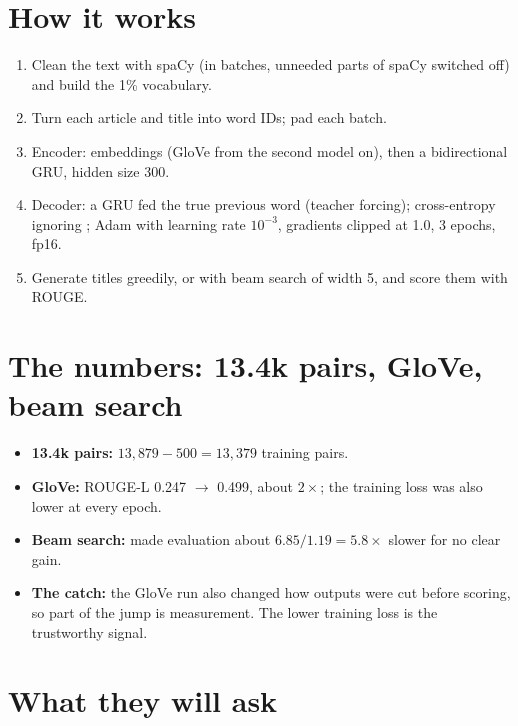 \section{How it works}
\begin{enumerate}
  \item Clean the text with spaCy (in batches, unneeded parts of spaCy switched off) and build the 1\% vocabulary.
  \item Turn each article and title into word IDs; pad each batch.
  \item Encoder: embeddings (GloVe from the second model on), then a bidirectional GRU, hidden size 300.
  \item Decoder: a GRU fed the true previous word (teacher forcing); cross-entropy ignoring ; Adam with learning rate $10^{-3}$, gradients clipped at 1.0, 3 epochs, fp16.
  \item Generate titles greedily, or with beam search of width 5, and score them with ROUGE.
\end{enumerate}

\section{The numbers: 13.4k pairs, GloVe, beam search}

\begin{measured}
\begin{itemize}
  \item \textbf{13.4k pairs:} $13{,}879 - 500 = 13{,}379$ training pairs.
  \item \textbf{GloVe:} ROUGE-L 0.247 $\to$ 0.499, about $2\times$; the training loss was also lower at every epoch.
  \item \textbf{Beam search:} made evaluation about $6.85/1.19 = 5.8\times$ slower for no clear gain.
  \item \textbf{The catch:} the GloVe run also changed how outputs were cut before scoring, so part of the jump is measurement. The lower training loss is the trustworthy signal.
\end{itemize}
\end{measured}

\section{What they will ask}

